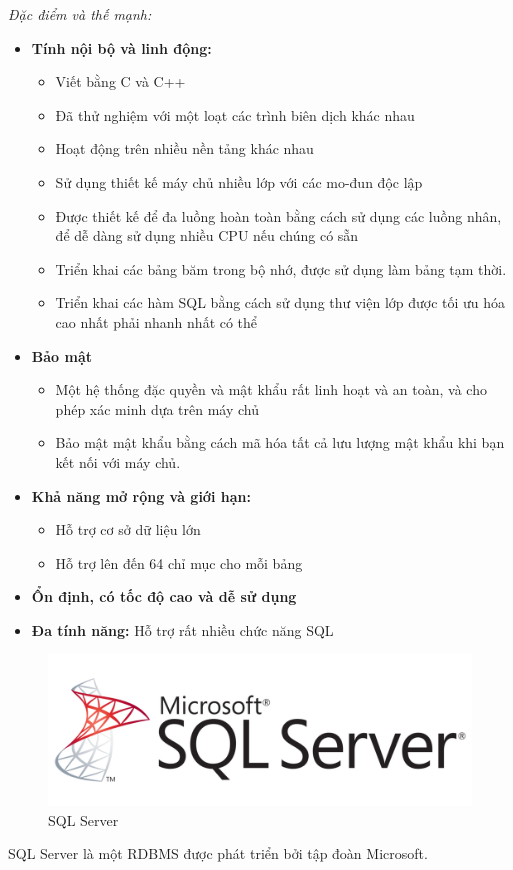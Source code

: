 \textit{Đặc điểm và thế mạnh:}
\begin{itemize}
    \item \textbf{Tính nội bộ và linh động:}
    \begin{itemize}
    \item Viết bằng C và C++
    \item Đã thử nghiệm với một loạt các trình biên dịch khác nhau
    \item Hoạt động trên nhiều nền tảng khác nhau
    \item Sử dụng thiết kế máy chủ nhiều lớp với các mo-đun độc lập
    \item Được thiết kế để đa luồng hoàn toàn bằng cách sử dụng các luồng nhân, để dễ dàng sử dụng nhiều CPU nếu chúng có sẵn
    \item Triển khai các bảng băm trong bộ nhớ, được sử dụng làm bảng tạm thời.
    \item Triển khai các hàm SQL bằng cách sử dụng thư viện lớp được tối ưu hóa cao nhất phải nhanh nhất có thể
    \end{itemize}
    \item \textbf{Bảo mật}
    \begin{itemize}
        \item Một hệ thống đặc quyền và mật khẩu rất linh hoạt và an toàn, và cho phép xác minh dựa trên máy chủ
        \item Bảo mật mật khẩu bằng cách mã hóa tất cả lưu lượng mật khẩu khi bạn kết nối với máy chủ.
    \end{itemize}
    \item \textbf{Khả năng mở rộng và giới hạn:}
    \begin{itemize}
        \item Hỗ trợ cơ sở dữ liệu lớn
        \item Hỗ trợ lên đến 64 chỉ mục cho mỗi bảng
    \end{itemize}
    \item \textbf{Ổn định, có tốc độ cao và dễ sử dụng}
    \item \textbf{Đa tính năng:} Hỗ trợ rất nhiều chức năng SQL
\end{itemize}
\begin{figure}[!h]
    \centering
    \includegraphics[scale=0.3]{img/sql-server.png}
    \caption{SQL Server}
\end{figure}
SQL Server là một RDBMS được phát triển bởi tập đoàn Microsoft.\\

